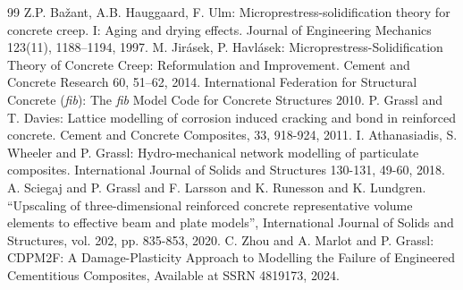 \documentclass[a4paper]{article}
\begin{document}
\begin{thebibliography}{99}
 Z.P. Ba\v{z}ant, A.B. Hauggaard, F. Ulm: Microprestress-solidification theory for concrete creep. {I}: Aging and drying effects. Journal of Engineering Mechanics 123(11), 1188–1194, 1997.
 M. Jir\'{a}sek, P. Havl\'{a}sek: Microprestress-Solidification Theory of Concrete Creep: Reformulation and Improvement. Cement and Concrete Research 60, 51–62, 2014.
 International Federation for Structural Concrete (\textit{fib}): The \textit{fib} Model Code for Concrete Structures 2010.
 P. Grassl and T. Davies: Lattice modelling of corrosion induced cracking and bond in reinforced concrete. Cement and Concrete Composites, 33, 918-924, 2011.
 I. Athanasiadis, S. Wheeler and P. Grassl: Hydro-mechanical network modelling of particulate composites. International Journal of Solids and Structures 130-131, 49-60, 2018.
 A. Sciegaj and P. Grassl and F. Larsson and K. Runesson and K. Lundgren. ``Upscaling of three-dimensional reinforced concrete representative volume elements to effective beam and plate models'', International Journal of Solids and Structures, vol. 202, pp. 835-853, 2020.
 C. Zhou and A. Marlot and P. Grassl: CDPM2F: A Damage-Plasticity Approach to Modelling the Failure of Engineered Cementitious Composites, Available at SSRN 4819173, 2024.
\end{thebibliography}
\end{document}
